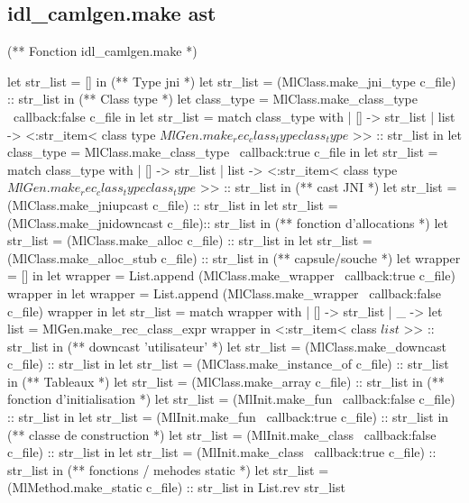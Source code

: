 \documentclass[a4paper, 11pt]{report}
\begin{document}
\subsection*{idl\_camlgen.make ast}
\begin{OCaml}
(** Fonction idl_camlgen.make *)

  let str_list = [] in
  (** Type jni *)
  let str_list = (MlClass.make_jni_type c_file) :: str_list in
  (** Class type *)
  let class_type = MlClass.make_class_type ~callback:false c_file in
  let str_list = match class_type with 
  | [] -> str_list 
  | list -> <:str_item< class type $MlGen.make_rec_class_type class_type$ >> :: str_list in
  let class_type = MlClass.make_class_type ~callback:true c_file in
  let str_list = match class_type with 
  | [] -> str_list 
  | list -> <:str_item< class type $MlGen.make_rec_class_type class_type$ >> :: str_list in
  (** cast JNI *)
  let str_list = (MlClass.make_jniupcast c_file) :: str_list in
  let str_list = (MlClass.make_jnidowncast c_file):: str_list in 
  (** fonction d'allocations *)
  let str_list = (MlClass.make_alloc c_file) :: str_list in
  let str_list = (MlClass.make_alloc_stub c_file) :: str_list in
  (** capsule/souche *)
  let wrapper = [] in
  let wrapper = List.append (MlClass.make_wrapper ~callback:true c_file) wrapper in
  let wrapper = List.append (MlClass.make_wrapper ~callback:false c_file) wrapper in
  let str_list = match wrapper with 
    | [] -> str_list 
    | _ ->
        let list = MlGen.make_rec_class_expr wrapper in
        <:str_item< class $list$ >> :: str_list
  in
  (** downcast 'utilisateur' *)
  let str_list = (MlClass.make_downcast c_file) :: str_list in
  let str_list = (MlClass.make_instance_of c_file) :: str_list in
  (** Tableaux *)
  let str_list = (MlClass.make_array c_file) :: str_list in
  (** fonction d'initialisation *)
  let str_list = (MlInit.make_fun ~callback:false c_file) :: str_list in
  let str_list = (MlInit.make_fun ~callback:true c_file) :: str_list in
  (** classe de construction *)
  let str_list = (MlInit.make_class ~callback:false c_file) :: str_list in
  let str_list = (MlInit.make_class ~callback:true c_file) :: str_list in
  (** fonctions / mehodes static *)
  let str_list = (MlMethod.make_static c_file) :: str_list in
  List.rev str_list
\end{OCaml}
\end{document}
